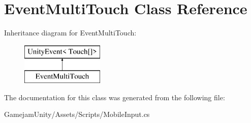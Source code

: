 \hypertarget{class_event_multi_touch}{}\section{Event\+Multi\+Touch Class Reference}
\label{class_event_multi_touch}
Inheritance diagram for Event\+Multi\+Touch\+:\begin{figure}[H]
\begin{center}
\leavevmode
\includegraphics[height=2.000000cm]{class_event_multi_touch}
\end{center}
\end{figure}


The documentation for this class was generated from the following file\+:\begin{DoxyCompactItemize}
\item 
Gamejam\+Unity/\+Assets/\+Scripts/Mobile\+Input.\+cs\end{DoxyCompactItemize}
